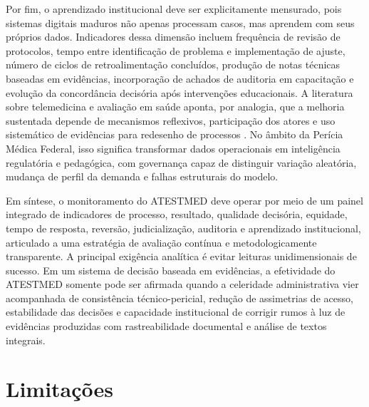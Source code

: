 \documentclass[12pt,a4paper]{article}
\begin{document}
Por fim, o aprendizado institucional deve ser explicitamente mensurado, pois sistemas digitais maduros não apenas processam casos, mas aprendem com seus próprios dados. Indicadores dessa dimensão incluem frequência de revisão de protocolos, tempo entre identificação de problema e implementação de ajuste, número de ciclos de retroalimentação concluídos, produção de notas técnicas baseadas em evidências, incorporação de achados de auditoria em capacitação e evolução da concordância decisória após intervenções educacionais. A literatura sobre telemedicina e avaliação em saúde aponta, por analogia, que a melhoria sustentada depende de mecanismos reflexivos, participação dos atores e uso sistemático de evidências para redesenho de processos \parencite{ftouni2022challengesoftelemedicineduringthecovid19pandemica, steenbeek2011thedevelopmentofinstrumentstomeasuretheworkdisa}. No âmbito da Perícia Médica Federal, isso significa transformar dados operacionais em inteligência regulatória e pedagógica, com governança capaz de distinguir variação aleatória, mudança de perfil da demanda e falhas estruturais do modelo.

Em síntese, o monitoramento do ATESTMED deve operar por meio de um painel integrado de indicadores de processo, resultado, qualidade decisória, equidade, tempo de resposta, reversão, judicialização, auditoria e aprendizado institucional, articulado a uma estratégia de avaliação contínua e metodologicamente transparente. A principal exigência analítica é evitar leituras unidimensionais de sucesso. Em um sistema de decisão baseada em evidências, a efetividade do ATESTMED somente pode ser afirmada quando a celeridade administrativa vier acompanhada de consistência técnico-pericial, redução de assimetrias de acesso, estabilidade das decisões e capacidade institucional de corrigir rumos à luz de evidências produzidas com rastreabilidade documental e análise de textos integrais.

\section{Limitações}
\label{sec:org910b024}
\end{document}
